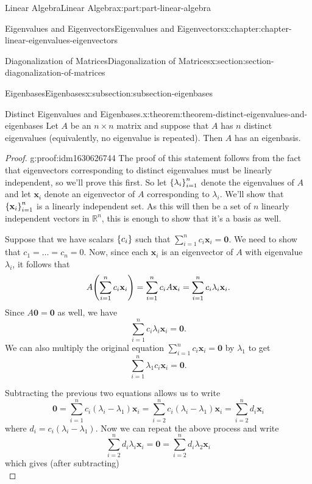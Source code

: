 \documentclass[twoside,10pt,]{book}
\numberwithin{equation}{part}
\newcommand{\RR}{\mathbb{R}}
\providecommand{\vb}[1]{\mathbf{#1}}
\newcommand{\xx}{\mathbf{x}}
\begin{document}
\begin{partptx}{Linear Algebra}{}{Linear Algebra}{}{}{x:part:part-linear-algebra}
\begin{chapterptx}{Eigenvalues and Eigenvectors}{}{Eigenvalues and Eigenvectors}{}{}{x:chapter:chapter-linear-eigenvalues-eigenvectors}
\begin{sectionptx}{Diagonalization of Matrices}{}{Diagonalization of Matrices}{}{}{x:section:section-diagonalization-of-matrices}
\begin{subsectionptx}{Eigenbases}{}{Eigenbases}{}{}{x:subsection:subsection-eigenbases}
\begin{theorem}{Distinct Eigenvalues and Eigenbases.}{}{x:theorem:theorem-distinct-eigenvalues-and-eigenbases}%
Let \(A\) be an \(n\times n\) matrix and suppose that \(A\) has \(n\) distinct eigenvalues (equivalently, no eigenvalue is repeated). Then \(A\) has an eigenbasis.%
\end{theorem}
\begin{proof}{}{g:proof:idm1630626744}
The proof of this statement follows from the fact that eigenvectors corresponding to distinct eigenvalues must be linearly independent, so we'll prove this first. So let \(\qty{\lambda_i}_{i=1}^n\) denote the eigenvalues of \(A\) and let \(\xx_i\) denote an eigenvector of \(A\) corresponding to \(\lambda_i\). We'll show that \(\qty{\xx_i}_{i=1}^n\) is a linearly independent set. As this will then be a set of \(n\) linearly independent vectors in \(\RR^n\), this is enough to show that it's a basis as well.%
\par
Suppose that we have scalars \(\qty{c_i}\) such that \(\sum_{i=1}^n c_i\xx_i = \vb{0}\). We need to show that \(c_1=\ldots=c_n=0\). Now, since each \(\xx_i\) is an eigenvector of \(A\) with eigenvalue \(\lambda_i\), it follows that%
\begin{equation*}
A\qty(\sum_{i=1}^n c_i\xx_i) = \sum_{i=1}^n c_i A\xx_i = \sum_{i=1}^n c_i\lambda_i\xx_i\text{.}
\end{equation*}
Since \(A\vb{0} = \vb{0}\) as well, we have%
\begin{equation*}
\sum_{i=1}^n c_i\lambda_i\xx_i = \vb{0}\text{.}
\end{equation*}
We can also multiply the original equation \(\sum_{i=1}^{n}c_i\xx_i = \vb{0}\) by \(\lambda_1\) to get%
\begin{equation*}
\sum_{i=1}^{n}\lambda_1 c_i\xx_i = \vb{0}\text{.}
\end{equation*}
%
\par
Subtracting the previous two equations allows us to write%
\begin{equation*}
\vb{0} = \sum_{i=1}^n c_i (\lambda_i - \lambda_1)\xx_i = \sum_{i=2}^n c_i(\lambda_i-\lambda_1)\xx_i = \sum_{i=2}^{n}d_i \xx_i
\end{equation*}
where \(d_i = c_i(\lambda_i-\lambda_1)\). Now we can repeat the above process and write%
\begin{equation*}
\sum_{i=2}^n d_i\lambda_i\xx_i = \vb{0} = \sum_{i=2}^n d_i\lambda_2\xx_i
\end{equation*}
which gives (after subtracting)%
\begin{equation*}

\end{equation*}
\end{proof}
\end{subsectionptx}
\end{sectionptx}
\end{chapterptx}
\end{partptx}
\end{document}
